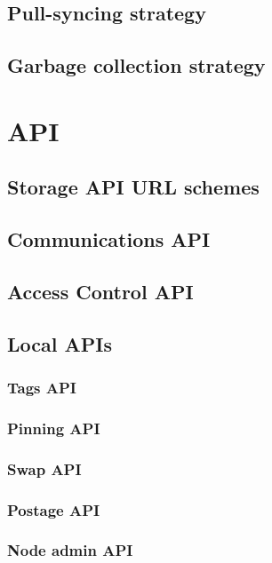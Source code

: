 \section{Pull-syncing strategy}\label{spec:strategy:pull-sync}

\section{Garbage collection strategy}\label{spec:strategy:garbage-collection}

% 
% 

\chapter{API}\label{spec:api}
\section{Storage API URL schemes}\label{spec:api:storage}

\section{Communications API}\label{spec:api:communications}

\section{Access Control API}\label{spec:api:access-control}

\section{Local APIs}
\subsection{Tags API}\label{spec:api:tags}

\subsection{Pinning API}\label{spec:api:pinning}

\subsection{Swap API}\label{spec:api:swap}

\subsection{Postage API}\label{spec:api:postage}

\subsection{Node admin API}\label{spec:api:admin}


